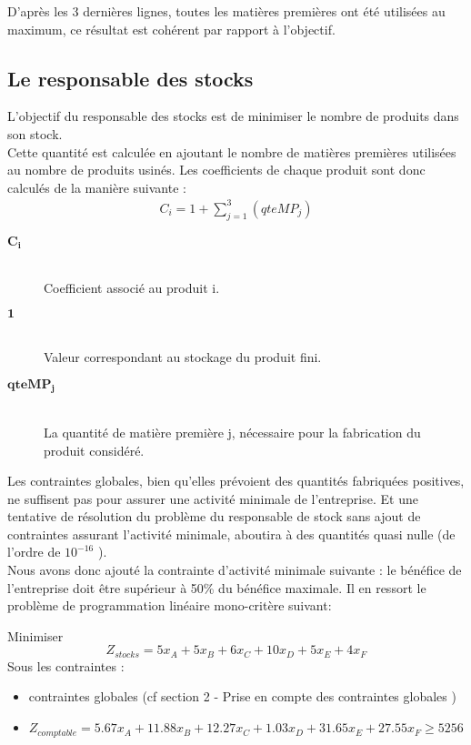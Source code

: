\documentclass[12pt]{article}
\begin{document}
D'après les 3 dernières lignes, toutes les matières premières ont été utilisées au maximum, ce résultat est cohérent par rapport à l'objectif.
\subsection{Le responsable des stocks}
L'objectif du responsable des stocks est de minimiser le nombre de produits dans son stock. \\
Cette quantité est calculée en ajoutant le nombre de matières premières utilisées au nombre de produits usinés. Les coefficients de chaque produit sont donc calculés de la manière suivante : 
\begin{align*} C_{i} = 1 +  \sum_{j=1}^{3}(qteMP_{j}) 
\end{align*}
\begin{description}
\item[$\mathbf{C_{i}}$]\hfill\\Coefficient associé au produit i.
\item[$\mathbf{1}$]\hfill\\ Valeur correspondant au stockage du produit fini.
\item[$\mathbf{qteMP_{j}}$]\hfill\\La quantité de matière première j, nécessaire pour la fabrication du produit considéré.
\end{description}
Les contraintes globales, bien qu'elles prévoient des quantités fabriquées positives, ne suffisent pas pour assurer une activité minimale de l'entreprise. Et une tentative de résolution du problème du responsable de stock sans ajout de contraintes assurant l'activité minimale, aboutira à des quantités quasi nulle (de l'ordre de $ 10 ^{-16}$ ).\\
Nous avons donc ajouté la contrainte d'activité minimale suivante : le bénéfice de l'entreprise doit être supérieur à 50\% du bénéfice maximale. 
Il en ressort le problème de programmation linéaire mono-critère suivant:
\begin{tcolorbox}
Minimiser
\begin{equation*}
 Z_{stocks}= 5x_{A} + 5x_{B} + 6x_{C} + 10x_{D} + 5x_{E} + 4x_{F}
\end{equation*}
Sous les contraintes :
\begin{itemize}
\item contraintes globales (cf section 2 - Prise en compte des contraintes globales )
\item $Z_{comptable}= 5.67x_{A} +11.88x_{B} +12.27x_{C} +1.03x_{D} +31.65x_{E} +27.55x_{F} \geq 5256$
\end{itemize}
\end{tcolorbox}
\end{document}
